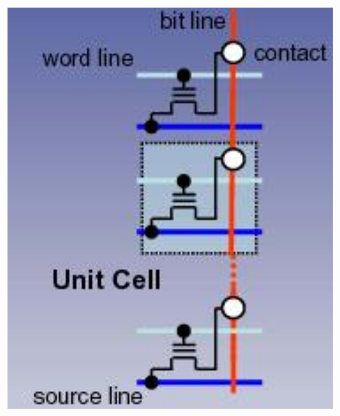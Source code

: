 \begin{figure}[h!]
    \centering
    \begin{minipage}[b]{0.4\textwidth}
        \includegraphics[width=\textwidth]{img/NOR.png}
    \end{minipage}
    \hfill
    \begin{minipage}[b]{0.4\textwidth}

\end{minipage}
\end{figure}
